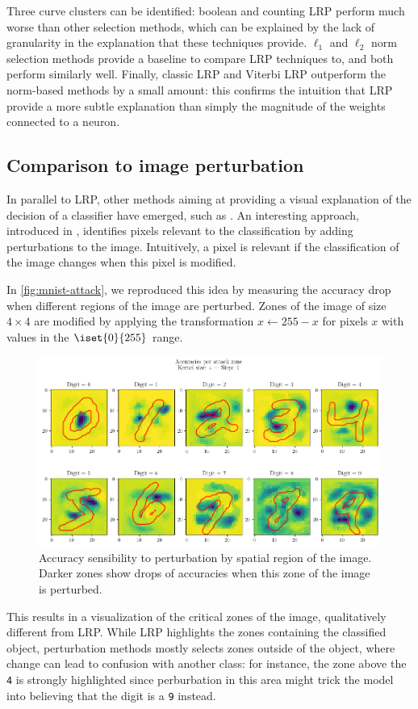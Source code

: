 \documentclass[twocolumn]{../cs-classes/cs-classes}
\newcommand*{\1}{\digitsbb{1}}
\newcommand*{\0}{\digitsbb{0}}
\begin{document}
Three curve clusters can be identified: boolean and counting LRP perform much worse than other selection methods, which can be explained by the lack of granularity in the explanation that these techniques provide. $\ell_1$ and $\ell_2$ norm selection methods provide a baseline to compare LRP techniques to, and both perform similarly well. Finally, classic LRP and Viterbi LRP outperform the norm-based methods by a small amount: this confirms the intuition that LRP provide a more subtle explanation than simply the magnitude of the weights connected to a neuron.

\subsection{Comparison to image perturbation}
In parallel to LRP, other methods aiming at providing a visual explanation of the decision of a classifier have emerged, such as \cite{inverting,visualizing-cnn}. An interesting approach, introduced in \cite{fong2017interpretable}, identifies pixels relevant to the classification by adding perturbations to the image. Intuitively, a pixel is relevant if the classification of the image changes when this pixel is modified. 

In \autoref{fig:mnist-attack}, we reproduced this idea by measuring the accuracy drop when different regions of the image are perturbed. Zones of the image of size $4\times4$ are modified by applying the transformation $x\longleftarrow255-x$ for pixels $x$ with values in the $\iset{0}{255}$ range. 
\begin{figure}[H]
    \centering
    \includegraphics[width=\linewidth]{attacks.png}
    \caption{Accuracy sensibility to perturbation by spatial region of the image. Darker zones show drops of accuracies when this zone of the image is perturbed.}
    \label{fig:mnist-attack}
\end{figure}
This results in a visualization of the critical zones of the image, qualitatively different from LRP. While LRP highlights the zones containing the classified object, perturbation methods mostly selects zones outside of the object, where change can lead to confusion with another class: for instance, the zone above the \texttt{4} is strongly highlighted since perburbation in this area might trick the model into believing that the digit is a \texttt{9} instead.
\end{document}
